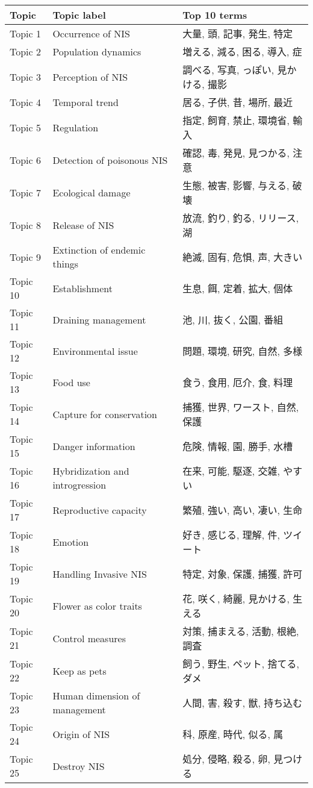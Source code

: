 \begin{table}[ht]
\centering
\begin{tabular}{lll}
  \hline
Topic & Topic label & Top 10 terms \\ 
  \hline
Topic 1 & Occurrence of NIS & 大量, 頭, 記事, 発生, 特定 \\ 
  Topic 2 & Population dynamics & 増える, 減る, 困る, 導入, 症 \\ 
  Topic 3 & Perception of NIS & 調べる, 写真, っぽい, 見かける, 撮影 \\ 
  Topic 4 & Temporal trend & 居る, 子供, 昔, 場所, 最近 \\ 
  Topic 5 & Regulation & 指定, 飼育, 禁止, 環境省, 輸入 \\ 
  Topic 6 & Detection of poisonous NIS & 確認, 毒, 発見, 見つかる, 注意 \\ 
  Topic 7 & Ecological damage & 生態, 被害, 影響, 与える, 破壊 \\ 
  Topic 8 & Release of NIS & 放流, 釣り, 釣る, リリース, 湖 \\ 
  Topic 9 & Extinction of endemic things & 絶滅, 固有, 危惧, 声, 大きい \\ 
  Topic 10 & Establishment & 生息, 餌, 定着, 拡大, 個体 \\ 
  Topic 11 & Draining management & 池, 川, 抜く, 公園, 番組 \\ 
  Topic 12 & Environmental issue & 問題, 環境, 研究, 自然, 多様 \\ 
  Topic 13 & Food use & 食う, 食用, 厄介, 食, 料理 \\ 
  Topic 14 & Capture for conservation & 捕獲, 世界, ワースト, 自然, 保護 \\ 
  Topic 15 & Danger information & 危険, 情報, 園, 勝手, 水槽 \\ 
  Topic 16 & Hybridization and introgression & 在来, 可能, 駆逐, 交雑, やすい \\ 
  Topic 17 & Reproductive capacity & 繁殖, 強い, 高い, 凄い, 生命 \\ 
  Topic 18 & Emotion & 好き, 感じる, 理解, 件, ツイート \\ 
  Topic 19 & Handling Invasive NIS & 特定, 対象, 保護, 捕獲, 許可 \\ 
  Topic 20 & Flower as color traits & 花, 咲く, 綺麗, 見かける, 生える \\ 
  Topic 21 & Control measures & 対策, 捕まえる, 活動, 根絶, 調査 \\ 
  Topic 22 & Keep as pets & 飼う, 野生, ペット, 捨てる, ダメ \\ 
  Topic 23 & Human dimension of management & 人間, 害, 殺す, 獣, 持ち込む \\ 
  Topic 24 & Origin of NIS & 科, 原産, 時代, 似る, 属 \\ 
  Topic 25 & Destroy NIS & 処分, 侵略, 殺る, 卵, 見つける \\ 
   \hline
\end{tabular}
\end{table}
